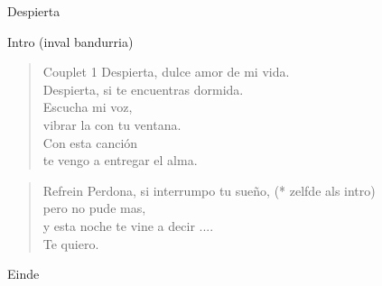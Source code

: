 \begin{song}[tango]{Despierta}


\begin{instrumental}{Intro \textnormal{(inval bandurria)}}
    
\measure{}   
\end{instrumental}{}

\begin{verse}{Couplet 1}
  Despierta, dulce amor de mi vida.\\
  Despierta, si te encuentras dormida. \\
  Escucha mi voz, \chord{}   \\
  vibrar la con tu ventana.  \\
  Con esta canci\'{o}n \chord{}   \\
  te vengo a entregar el alma.
\end{verse}

\begin{verse}{Refrein}
  Perdona, \hspace{4em} si interrumpo tu sue\~{n}o,  \hspace{3em} (* zelfde als intro)\\
  pero no pude mas,  \\
  y esta noche te vine a decir ....  \\
  Te quiero.
\end{verse}


\begin{instrumental}{Einde}
\end{instrumental}

\end{song}
